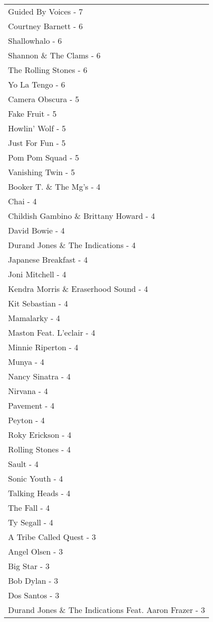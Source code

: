 \documentclass[
]{article}
\begin{document}
\begin{longtable}{l}
Guided By Voices - 7 \\ 
Courtney Barnett - 6 \\ 
Shallowhalo - 6 \\ 
Shannon \& The Clams - 6 \\ 
The Rolling Stones - 6 \\ 
Yo La Tengo - 6 \\ 
Camera Obscura - 5 \\ 
Fake Fruit - 5 \\ 
Howlin' Wolf - 5 \\ 
Just For Fun - 5 \\ 
Pom Pom Squad - 5 \\ 
Vanishing Twin - 5 \\ 
Booker T. \& The Mg's - 4 \\ 
Chai - 4 \\ 
Childish Gambino \& Brittany Howard - 4 \\ 
David Bowie - 4 \\ 
Durand Jones \& The Indications - 4 \\ 
Japanese Breakfast - 4 \\ 
Joni Mitchell - 4 \\ 
Kendra Morris \& Eraserhood Sound - 4 \\ 
Kit Sebastian - 4 \\ 
Mamalarky - 4 \\ 
Maston Feat. L'eclair - 4 \\ 
Minnie Riperton - 4 \\ 
Munya - 4 \\ 
Nancy Sinatra - 4 \\ 
Nirvana - 4 \\ 
Pavement - 4 \\ 
Peyton - 4 \\ 
Roky Erickson - 4 \\ 
Rolling Stones - 4 \\ 
Sault - 4 \\ 
Sonic Youth - 4 \\ 
Talking Heads - 4 \\ 
The Fall - 4 \\ 
Ty Segall - 4 \\ 
A Tribe Called Quest - 3 \\ 
Angel Olsen - 3 \\ 
Big Star - 3 \\ 
Bob Dylan - 3 \\ 
Dos Santos - 3 \\ 
Durand Jones \& The Indications Feat. Aaron Frazer - 3 \\ 

\end{longtable}
\end{document}
